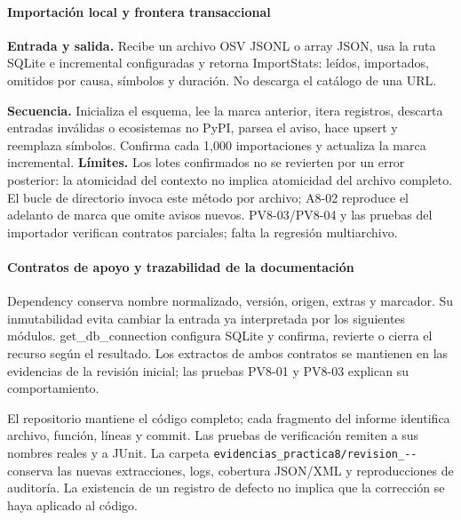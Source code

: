\paragraph*{Importación local y frontera transaccional}
\textbf{Entrada y salida.} Recibe un archivo OSV JSONL o array JSON, usa la ruta SQLite e incremental configuradas y retorna ImportStats: leídos, importados, omitidos por causa, símbolos y duración. No descarga el catálogo de una URL.
\par\begingroup{}

\endgroup
{}
\textbf{Secuencia.} Inicializa el esquema, lee la marca anterior, itera registros, descarta entradas inválidas o ecosistemas no PyPI, parsea el aviso, hace upsert y reemplaza símbolos. Confirma cada 1,000 importaciones y actualiza la marca incremental. \textbf{Límites.} Los lotes confirmados no se revierten por un error posterior: la atomicidad del contexto no implica atomicidad del archivo completo. El bucle de directorio invoca este método por archivo; A8-02 reproduce el adelanto de marca que omite avisos nuevos. PV8-03/PV8-04 y las pruebas del importador verifican contratos parciales; falta la regresión multiarchivo.
\paragraph*{Contratos de apoyo y trazabilidad de la documentación}
Dependency conserva nombre normalizado, versión, origen, extras y marcador. Su inmutabilidad evita cambiar la entrada ya interpretada por los siguientes módulos. get\_db\_connection configura SQLite y confirma, revierte o cierra el recurso según el resultado. Los extractos de ambos contratos se mantienen en las evidencias de la revisión inicial; las pruebas PV8-01 y PV8-03 explican su comportamiento.

El repositorio mantiene el código completo; cada fragmento del informe identifica archivo, función, líneas y commit. Las pruebas de verificación remiten a sus nombres reales y a JUnit. La carpeta \texttt{evidencias\_\allowbreak practica8/\allowbreak revision\_--} conserva las nuevas extracciones, logs, cobertura JSON/XML y reproducciones de auditoría. La existencia de un registro de defecto no implica que la corrección se haya aplicado al código.

